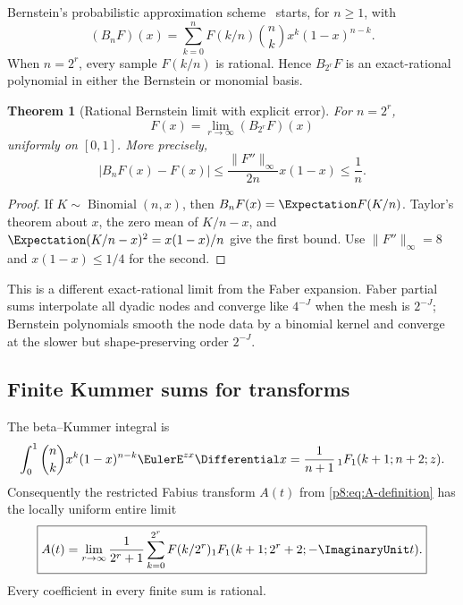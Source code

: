 \documentclass[11pt]{article}
\newtheorem{theorem}{Theorem}[section]
\theoremstyle{definition}
\theoremstyle{remark}
\begin{document}
Bernstein's probabilistic approximation scheme~\cite{p8:bernstein1912} starts, for $n\ge1$, with
\begin{equation}
 (B_nF)(x)=\sum_{k=0}^{n}F(k/n)\binom nkx^k(1-x)^{n-k}.  \label{p8:eq:bernstein-F}
\end{equation}
When $n=2^r$, every sample $F(k/n)$ is rational.  Hence $B_{2^r}F$ is an
exact-rational polynomial in either the Bernstein or monomial basis.

\begin{theorem}[Rational Bernstein limit with explicit error]
\label{p8:thm:bernstein-F}
For $n=2^r$,
\begin{equation}
 \boxed{\displaystyle
 F(x)=\lim_{r\to\infty}(B_{2^r}F)(x)}                   \label{p8:eq:bernstein-limit}
\end{equation}
uniformly on $[0,1]$.  More precisely,
\begin{equation}
 |B_nF(x)-F(x)|
 \le\frac{\|F''\|_\infty}{2n}x(1-x)
 \le\frac1n.                                            \label{p8:eq:bernstein-error}
\end{equation}
\end{theorem}

\begin{proof}
If $K\sim\operatorname{Binomial}(n,x)$, then
$B_nF(x)=\Expectation F(K/n)$.  Taylor's theorem about $x$, the zero mean of
$K/n-x$, and
$\Expectation(K/n-x)^2=x(1-x)/n$ give the first bound.  Use
$\|F''\|_\infty=8$ and $x(1-x)\le1/4$ for the second.
\end{proof}

This is a different exact-rational limit from the Faber expansion.  Faber
partial sums interpolate all dyadic nodes and converge like $4^{-J}$ when
the mesh is $2^{-J}$; Bernstein polynomials smooth the node data by a binomial
kernel and converge at the slower but shape-preserving order $2^{-J}$.

\subsection{Finite Kummer sums for transforms}

The beta--Kummer integral is
\begin{equation}
 \int_0^1\binom nkx^k(1-x)^{n-k}\EulerE^{zx}\Differential x
 =\frac1{n+1}\,{}_1F_1(k+1;n+2;z).                      \label{p8:eq:beta-kummer}
\end{equation}
Consequently the restricted Fabius transform
$A(t)$ from \eqref{p8:eq:A-definition} has the locally uniform entire limit
\begin{equation}
 \boxed{\displaystyle
 A(t)=\lim_{r\to\infty}\frac1{2^r+1}
 \sum_{k=0}^{2^r}F(k/2^r)
 {}_1F_1(k+1;2^r+2;-\ImaginaryUnit t).}                            \label{p8:eq:F-bernstein-kummer}
\end{equation}
Every coefficient in every finite sum is rational.
\end{document}
